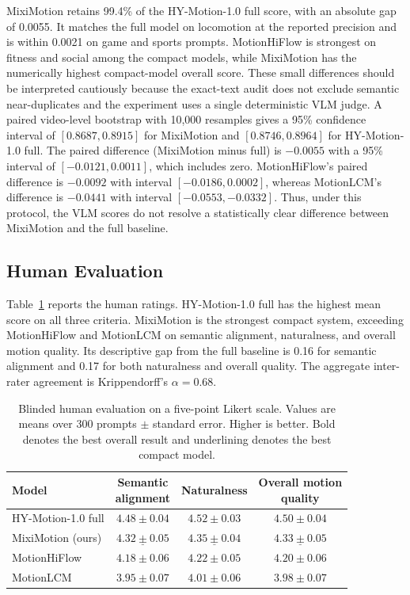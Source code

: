 \documentclass[runningheads]{llncs}
\begin{document}
MixiMotion retains 99.4\% of the HY-Motion-1.0 full score, with an absolute
gap of 0.0055. It matches the full model on locomotion at the reported
precision and is within 0.0021 on game and sports prompts. MotionHiFlow is
strongest on fitness and social among the compact models, while MixiMotion has
the numerically highest compact-model overall score. These small differences should be
interpreted cautiously because the exact-text audit does not exclude semantic
near-duplicates and the experiment uses a single deterministic VLM judge. A
paired video-level bootstrap with 10,000 resamples gives a 95\% confidence
interval of $[0.8687, 0.8915]$ for MixiMotion and $[0.8746, 0.8964]$ for
HY-Motion-1.0 full. The paired difference (MixiMotion minus full) is $-0.0055$
with a 95\% interval of $[-0.0121, 0.0011]$, which includes zero.
MotionHiFlow's paired difference is $-0.0092$ with interval
$[-0.0186, 0.0002]$, whereas MotionLCM's difference is $-0.0441$ with interval
$[-0.0553, -0.0332]$. Thus, under this protocol, the VLM scores do not resolve
a statistically clear difference between MixiMotion and the full baseline.

\subsection{Human Evaluation}

Table~\ref{tab:human-evaluation} reports the human ratings. HY-Motion-1.0 full
has the highest mean score on all three criteria. MixiMotion is the strongest
compact system, exceeding MotionHiFlow and MotionLCM on semantic alignment,
naturalness, and overall motion quality. Its descriptive gap from the full
baseline is 0.16 for semantic alignment and 0.17 for both naturalness and
overall quality. The aggregate inter-rater agreement is
Krippendorff's $\alpha=0.68$.

\begin{table}[H]
\caption{Blinded human evaluation on a five-point Likert scale. Values are
means over 300 prompts $\pm$ standard error. Higher is better. Bold denotes
the best overall result and underlining denotes the best compact model.}
\label{tab:human-evaluation}
\centering
\small
\setlength{\tabcolsep}{4pt}
\renewcommand{\arraystretch}{1.12}
\begin{tabular*}{\textwidth}{@{\extracolsep{\fill}}lccc@{}}
\hline
Model &
\shortstack{Semantic\\alignment} &
Naturalness &
\shortstack{Overall motion\\quality} \\
\hline
HY-Motion-1.0 full & $\mathbf{4.48\pm0.04}$ & $\mathbf{4.52\pm0.03}$ & $\mathbf{4.50\pm0.04}$ \\
MixiMotion (ours) & $\underline{4.32\pm0.05}$ & $\underline{4.35\pm0.04}$ & $\underline{4.33\pm0.05}$ \\
MotionHiFlow & $4.18\pm0.06$ & $4.22\pm0.05$ & $4.20\pm0.06$ \\
MotionLCM & $3.95\pm0.07$ & $4.01\pm0.06$ & $3.98\pm0.07$ \\
\hline
\end{tabular*}
\end{table}
\end{document}

